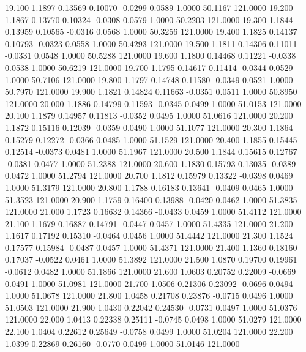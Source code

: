   19.100   1.1897   0.13569   0.10070  -0.0299   0.0589   1.0000  50.1167 121.0000
  19.200   1.1867   0.13770   0.10324  -0.0308   0.0579   1.0000  50.2203 121.0000
  19.300   1.1844   0.13959   0.10565  -0.0316   0.0568   1.0000  50.3256 121.0000
  19.400   1.1825   0.14137   0.10793  -0.0323   0.0558   1.0000  50.4293 121.0000
  19.500   1.1811   0.14306   0.11011  -0.0331   0.0548   1.0000  50.5288 121.0000
  19.600   1.1800   0.14468   0.11221  -0.0338   0.0538   1.0000  50.6219 121.0000
  19.700   1.1795   0.14617   0.11414  -0.0344   0.0529   1.0000  50.7106 121.0000
  19.800   1.1797   0.14748   0.11580  -0.0349   0.0521   1.0000  50.7970 121.0000
  19.900   1.1821   0.14824   0.11663  -0.0351   0.0511   1.0000  50.8950 121.0000
  20.000   1.1886   0.14799   0.11593  -0.0345   0.0499   1.0000  51.0153 121.0000
  20.100   1.1879   0.14957   0.11813  -0.0352   0.0495   1.0000  51.0616 121.0000
  20.200   1.1872   0.15116   0.12039  -0.0359   0.0490   1.0000  51.1077 121.0000
  20.300   1.1864   0.15279   0.12272  -0.0366   0.0485   1.0000  51.1529 121.0000
  20.400   1.1855   0.15445   0.12514  -0.0373   0.0481   1.0000  51.1967 121.0000
  20.500   1.1844   0.15615   0.12767  -0.0381   0.0477   1.0000  51.2388 121.0000
  20.600   1.1830   0.15793   0.13035  -0.0389   0.0472   1.0000  51.2794 121.0000
  20.700   1.1812   0.15979   0.13322  -0.0398   0.0469   1.0000  51.3179 121.0000
  20.800   1.1788   0.16183   0.13641  -0.0409   0.0465   1.0000  51.3523 121.0000
  20.900   1.1759   0.16400   0.13988  -0.0420   0.0462   1.0000  51.3835 121.0000
  21.000   1.1723   0.16632   0.14366  -0.0433   0.0459   1.0000  51.4112 121.0000
  21.100   1.1679   0.16887   0.14791  -0.0447   0.0457   1.0000  51.4335 121.0000
  21.200   1.1617   0.17192   0.15310  -0.0464   0.0456   1.0000  51.4442 121.0000
  21.300   1.1524   0.17577   0.15984  -0.0487   0.0457   1.0000  51.4371 121.0000
  21.400   1.1360   0.18160   0.17037  -0.0522   0.0461   1.0000  51.3892 121.0000
  21.500   1.0870   0.19700   0.19961  -0.0612   0.0482   1.0000  51.1866 121.0000
  21.600   1.0603   0.20752   0.22009  -0.0669   0.0491   1.0000  51.0981 121.0000
  21.700   1.0506   0.21306   0.23092  -0.0696   0.0494   1.0000  51.0678 121.0000
  21.800   1.0458   0.21708   0.23876  -0.0715   0.0496   1.0000  51.0503 121.0000
  21.900   1.0430   0.22042   0.24530  -0.0731   0.0497   1.0000  51.0376 121.0000
  22.000   1.0413   0.22338   0.25111  -0.0745   0.0498   1.0000  51.0279 121.0000
  22.100   1.0404   0.22612   0.25649  -0.0758   0.0499   1.0000  51.0204 121.0000
  22.200   1.0399   0.22869   0.26160  -0.0770   0.0499   1.0000  51.0146 121.0000
